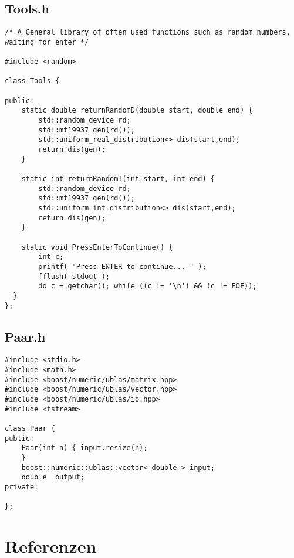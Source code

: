 \documentclass[10pt]{article}
\begin{document}
\subsection{Tools.h}

\begin{lstlisting}
/* A General library of often used functions such as random numbers, waiting for enter */

#include <random>

class Tools {

public:
	static double returnRandomD(double start, double end) {
		std::random_device rd;
		std::mt19937 gen(rd());
		std::uniform_real_distribution<> dis(start,end);
		return dis(gen);
	}

	static int returnRandomI(int start, int end) {
		std::random_device rd;
		std::mt19937 gen(rd());
		std::uniform_int_distribution<> dis(start,end);
		return dis(gen);
	}

	static void PressEnterToContinue() {
		int c;
		printf( "Press ENTER to continue... " );
		fflush( stdout );
		do c = getchar(); while ((c != '\n') && (c != EOF));
  }
};
\end{lstlisting}

\subsection{Paar.h}
\begin{lstlisting}
#include <stdio.h>
#include <math.h>
#include <boost/numeric/ublas/matrix.hpp>
#include <boost/numeric/ublas/vector.hpp>
#include <boost/numeric/ublas/io.hpp>
#include <fstream>

class Paar {
public:
	Paar(int n) { input.resize(n);
	}
	boost::numeric::ublas::vector< double > input;
	double  output;
private:

};

\end{lstlisting}
\section{Referenzen}

\end{document}
